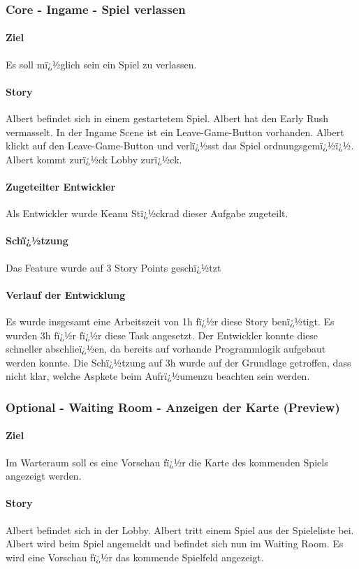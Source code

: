 \documentclass[12pt, titlepage]{scrartcl}
\begin{document}
			\subsubsection{Core - Ingame - Spiel verlassen}
			\paragraph{Ziel} Es soll mï¿½glich sein ein Spiel zu verlassen.
			\paragraph{Story} Albert befindet sich in einem gestartetem Spiel. Albert hat den Early Rush vermasselt. In der Ingame Scene ist ein Leave-Game-Button vorhanden. Albert klickt auf den Leave-Game-Button und verlï¿½sst das Spiel ordnungsgemï¿½ï¿½. Albert kommt zurï¿½ck Lobby zurï¿½ck.
			\paragraph{Zugeteilter Entwickler} Als Entwickler wurde Keanu Stï¿½ckrad dieser Aufgabe zugeteilt.
			\paragraph{Schï¿½tzung}
			Das Feature wurde auf 3 Story Points geschï¿½tzt
			\paragraph{Verlauf der Entwicklung} 
			Es wurde insgesamt eine Arbeitszeit von 1h fï¿½r diese Story benï¿½tigt. Es wurden 3h fï¿½r fï¿½r diese Task angesetzt. Der Entwickler konnte diese schneller abschlieï¿½en, da bereits auf vorhande Programmlogik aufgebaut werden konnte. Die Schï¿½tzung auf 3h wurde auf der Grundlage getroffen, dass nicht klar, welche Aspkete beim \glqq Aufrï¿½umen\grqq zu beachten sein werden.
			
			\subsubsection{Optional - Waiting Room - Anzeigen der Karte (Preview)}
			\paragraph{Ziel} Im Warteraum soll es eine Vorschau fï¿½r die Karte des kommenden Spiels angezeigt werden.
			\paragraph{Story} Albert befindet sich in der Lobby. Albert tritt einem Spiel aus der Spieleliste bei. Albert wird beim Spiel angemeldt und befindet sich nun im Waiting Room. Es wird eine Vorschau fï¿½r das kommende Spielfeld angezeigt.
\end{document}
